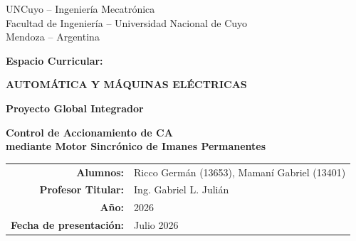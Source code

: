 \documentclass[10pt,a4paper]{article}
\newcommand{\nombreMateria}{AUTOMÁTICA Y MÁQUINAS ELÉCTRICAS}
\newcommand{\alumnos}{Ricco Germán (13653), Mamaní Gabriel (13401)}
\newcommand{\anioProyecto}{2026}
\newcommand{\fechaPresentacion}{Julio 2026}
\newcommand{\profesor}{Ing. Gabriel L. Julián}
\begin{document}
\begin{titlepage}
    \thispagestyle{empty}
    \centering

    \vspace*{0.7cm}

    {\large UNCuyo -- Ingeniería Mecatrónica\\[2pt]
    Facultad de Ingeniería -- Universidad Nacional de Cuyo\\[2pt]
    Mendoza -- Argentina}\par

    \vspace{1.1cm}

    {\Large \textbf{Espacio Curricular:}}\par
    {\Large \textbf{\nombreMateria}}\par

    \vspace{1.6cm}

    {\Huge \textbf{Proyecto Global Integrador}}\par

    \vspace{1.0cm}

    \begin{minipage}{0.92\textwidth}
        \centering
        {\LARGE\bfseries Control de Accionamiento de CA\\[6pt]
        mediante Motor Sincrónico de Imanes Permanentes\par}
    \end{minipage}

    \vfill

    \begin{tabular}{rl}
        \textbf{Alumnos:} & \alumnos \\
        \textbf{Profesor Titular:} & \profesor \\
        \textbf{Año:} & \anioProyecto \\
        \textbf{Fecha de presentación:} & \fechaPresentacion \\
    \end{tabular}

    \vspace*{0.8cm}
\end{titlepage}

\clearpage
\setcounter{page}{1}
\pagestyle{fancy}
\end{document}
